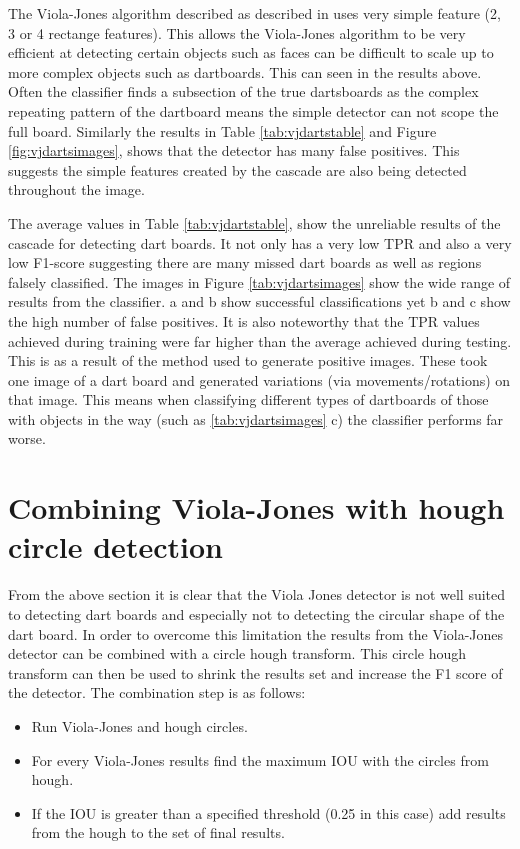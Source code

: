 \documentclass{article}
\begin{document}
\begin{multicols}{2}
The Viola-Jones algorithm described as described in \cite{vj} uses very simple feature (2, 3 or 4 rectange features). This allows the Viola-Jones algorithm to be very efficient at detecting certain objects such as faces can be difficult to scale up to more complex objects such as dartboards. This can seen in the results above. Often the classifier finds a subsection of the true dartsboards as the complex repeating pattern of the dartboard means the simple detector can not scope the full board. Similarly the results in Table \ref{tab:vjdartstable} and Figure \ref{fig:vjdartsimages}, shows that the detector has many false positives. This suggests the simple features created by the cascade are also being detected throughout the image.

The average values in Table \ref{tab:vjdartstable}, show the unreliable results of
the cascade for detecting dart boards.  It not only has a very low TPR and also
a very low F1-score suggesting there are many missed dart boards as well as
regions falsely classified. The images in Figure \ref{tab:vjdartsimages} show
the wide range of results from the classifier. a and b show successful
classifications yet b and c show the high number of false positives. It is also
noteworthy that the TPR values achieved during training were far higher than
the average achieved during testing. This is as a result of the method used to
generate positive images. These took one image of a dart board and generated
variations (via movements/rotations) on that image. This means when classifying
different types of dartboards of those with objects in the way (such as
\ref{tab:vjdartsimages} c) the classifier performs far worse.

\section{Combining Viola-Jones with hough circle detection}

From the above section it is clear that the Viola Jones detector is not well
suited to detecting dart boards and especially not to detecting the circular
shape of the dart board. In order to overcome this limitation the results from
the Viola-Jones detector can be combined with a circle hough transform. This
circle hough transform can then be used to shrink the results set and increase
the F1 score of the detector. The combination step is as follows:

\begin{itemize}
  \item Run Viola-Jones and hough circles.
  \item For every Viola-Jones results find the maximum IOU with the circles
    from hough. 
  \item If the IOU is greater than a specified threshold (0.25 in this case)
    add results from the hough to the set of final results. 
\end{itemize} 


\end{multicols}
\end{document}
